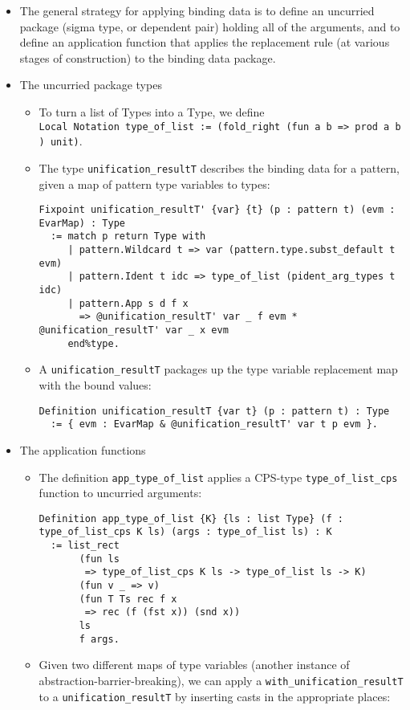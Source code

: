 \documentclass[
]{article}
\providecommand{\tightlist}{%
  \setlength{\itemsep}{0pt}\setlength{\parskip}{0pt}}
\begin{document}
\begin{itemize}
  \begin{itemize}
  \tightlist
  \item
    The general strategy for applying binding data is to define an
    uncurried package (sigma type, or dependent pair) holding all of the
    arguments, and to define an application function that applies the
    replacement rule (at various stages of construction) to the binding
    data package.
  \item
    The uncurried package types

    \begin{itemize}
    \item
      To turn a list of Types into a Type, we define
      \texttt{Local\ Notation\ type\_of\_list\ :=\ (fold\_right\ (fun\ a\ b\ =\textgreater{}\ prod\ a\ b)\ unit)}.
    \item
      The type \texttt{unification\_resultT\textquotesingle{}} describes
      the binding data for a pattern, given a map of pattern type
      variables to types:

\begin{verbatim}
Fixpoint unification_resultT' {var} {t} (p : pattern t) (evm : EvarMap) : Type
  := match p return Type with
     | pattern.Wildcard t => var (pattern.type.subst_default t evm)
     | pattern.Ident t idc => type_of_list (pident_arg_types t idc)
     | pattern.App s d f x
       => @unification_resultT' var _ f evm * @unification_resultT' var _ x evm
     end%type.
\end{verbatim}
    \item
      A \texttt{unification\_resultT} packages up the type variable
      replacement map with the bound values:

\begin{verbatim}
Definition unification_resultT {var t} (p : pattern t) : Type
  := { evm : EvarMap & @unification_resultT' var t p evm }.
\end{verbatim}
    \end{itemize}
  \item
    The application functions

    \begin{itemize}
    \item
      The definition \texttt{app\_type\_of\_list} applies a CPS-type
      \texttt{type\_of\_list\_cps} function to uncurried arguments:

\begin{verbatim}
Definition app_type_of_list {K} {ls : list Type} (f : type_of_list_cps K ls) (args : type_of_list ls) : K
  := list_rect
       (fun ls
        => type_of_list_cps K ls -> type_of_list ls -> K)
       (fun v _ => v)
       (fun T Ts rec f x
        => rec (f (fst x)) (snd x))
       ls
       f args.
\end{verbatim}
    \item
      Given two different maps of type variables (another instance of
      abstraction-barrier-breaking), we can apply a
      \texttt{with\_unification\_resultT\textquotesingle{}} to a
      \texttt{unification\_resultT\textquotesingle{}} by inserting casts
      in the appropriate places:


\end{itemize}
\end{itemize}
\end{itemize}
\end{document}
